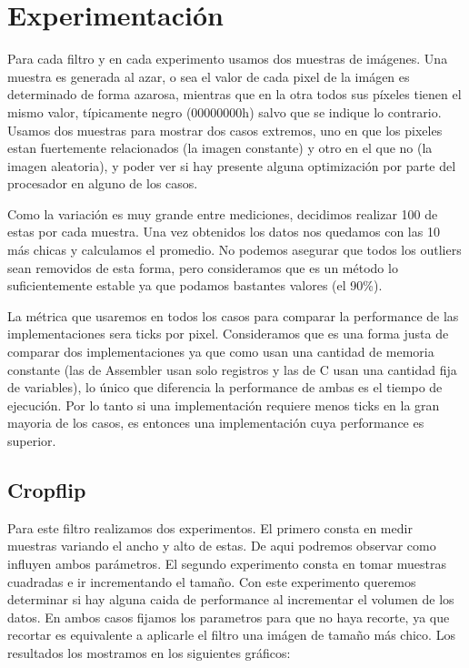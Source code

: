 \section{Experimentación}
Para cada filtro y en cada experimento usamos dos muestras de imágenes. Una muestra es generada al azar, o sea el valor de cada pixel de la imágen es determinado de forma azarosa, mientras que en la otra todos sus píxeles tienen el mismo valor, típicamente negro (00000000h) salvo que se indique lo contrario. Usamos dos muestras para mostrar dos casos extremos, uno en que los pixeles estan fuertemente relacionados (la imagen constante) y otro en el que no (la imagen aleatoria), y poder ver si hay presente alguna optimización por parte del procesador en alguno de los casos. 

Como la variación es muy grande entre mediciones, decidimos realizar 100 de estas por cada muestra. Una vez obtenidos los datos nos quedamos con las 10 más chicas y calculamos el promedio. No podemos asegurar que todos los outliers sean removidos de esta forma, pero consideramos que es un método lo suficientemente estable ya que podamos bastantes valores (el 90\%). 

La métrica que usaremos en todos los casos para comparar la performance de las implementaciones sera ticks por pixel. Consideramos que es una forma justa de comparar dos implementaciones ya que como usan una cantidad de memoria constante (las de Assembler usan solo registros y las de C usan una cantidad fija de variables), lo único que diferencia la performance de ambas es el tiempo de ejecución. Por lo tanto si una implementación requiere menos ticks en la gran mayoria de los casos, es entonces una implementación cuya performance es superior.
\subsection{Cropflip}
Para este filtro realizamos dos experimentos. El primero consta en medir muestras variando el ancho y alto de estas. De aqui podremos observar como influyen ambos parámetros. El segundo experimento consta en tomar muestras cuadradas e ir incrementando el tamaño. Con este experimento queremos determinar si hay alguna caida de performance al incrementar el volumen de los datos. En ambos casos fijamos los parametros para que no haya recorte, ya que recortar es equivalente a aplicarle el filtro una imágen de tamaño más chico. Los resultados los mostramos en los siguientes gráficos:



